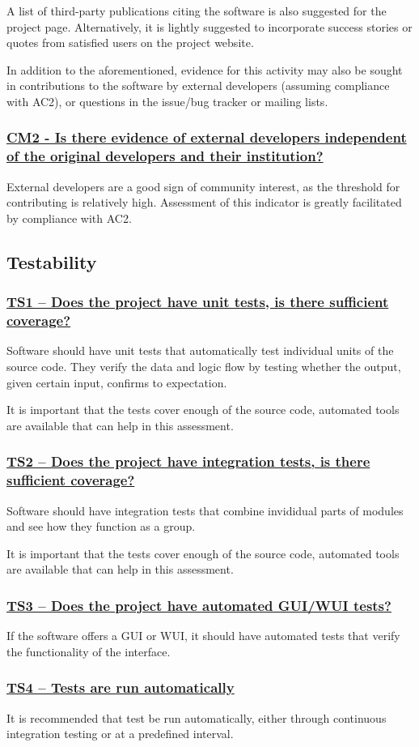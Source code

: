 \documentclass[a4paper,11pt]{article}
\newcommand{\criterion}[1]{\subsubsection*{\underline{#1}}}
\begin{document}
A list of third-party publications citing the software is also suggested for
the project page. Alternatively, it is lightly suggested to
incorporate success stories or quotes from satisfied users on the project
website.

In addition to the aforementioned, evidence for this activity may also be sought
in contributions to the software by external developers (assuming
compliance with AC2), or questions in the issue/bug tracker or mailing lists.

\criterion{CM2 - Is there evidence of external developers independent of
the original developers and their institution?}

External developers are a good sign of community interest, as the threshold for
contributing is relatively high. Assessment of this indicator is greatly facilitated by
compliance with AC2.


\subsection{Testability}

\criterion{TS1 -- Does the project have unit tests, is there sufficient coverage?}

Software should have unit tests that automatically test individual units of the
source code. They verify the data and logic flow by testing whether the output,
given certain input, confirms to expectation.

It is important that the tests cover enough of the source code, automated tools
are available that can help in this assessment.

\criterion{TS2 -- Does the project have integration tests, is there sufficient coverage?}

Software should have integration tests that combine invididual parts of modules and see how they function
as a group.

It is important that the tests cover enough of the source code, automated tools
are available that can help in this assessment.

\criterion{TS3 -- Does the project have automated GUI/WUI tests?}

If the software offers a GUI or WUI, it should have automated tests that verify
the functionality of the interface.

\criterion{TS4 -- Tests are run automatically}

It is recommended that test be run automatically, either through continuous
integration testing or at a predefined interval.
\end{document}
